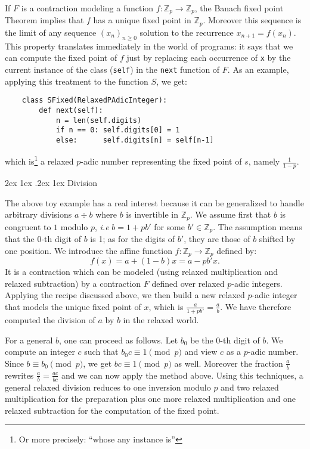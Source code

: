 \documentclass[11pt]{article}
\makeatletter
\numberwithin{equation}{section}
\numberwithin{figure}{section}
\renewcommand\paragraph{\@startsection{paragraph}{4}{\z@}%
                                    {2ex \@plus1ex \@minus.2ex}%
                                    {1ex}%
                                    {\normalfont\normalsize\bfseries}}
\renewcommand{\geq}{\geqslant}
\theoremstyle{definition}
\newcommand{\Z}{\mathbb Z}
\newcommand{\Zp}{\Z_p}
\newcommand{\ttx}{\texttt{\rm x}\xspace}
\makeatother
\begin{document}
If $F$ is a contraction modeling a function $f : \Zp \to \Zp$, the 
Banach fixed point Theorem implies that $f$ has a unique fixed point in 
$\Zp$. Moreover this sequence is the limit of any sequence 
$(x_n)_{n\geq0}$ solution to the recurrence $x_{n+1} = f(x_n)$. This 
property translates immediately in the world of programs: it says that 
we can compute the fixed point of $f$ just by replacing each occurrence 
of \ttx by the current instance of the class (\texttt{self}) in the 
\texttt{next} function of $F$. 
As an example, applying this treatment to the function $S$, we get:

\begin{lstlisting}
    class SFixed(RelaxedPAdicInteger):
        def next(self):
            n = len(self.digits)
            if n == 0: self.digits[0] = 1
            else:      self.digits[n] = self[n-1]
\end{lstlisting}

\noindent
which is\footnote{Or more precisely: ``whose any instance is''} a 
relaxed $p$-adic number representing the fixed point of $s$, namely
$\frac 1{1-p}$.

\paragraph{Division}

The above toy example has a real interest because it can be generalized 
to handle arbitrary divisions $a \div b$ where $b$ is invertible in $\Zp$.
We assume first that $b$ is congruent to $1$ modulo $p$, \emph{i.e} $b = 
1 + pb'$ for some $b' \in \Zp$. The assumption means that the $0$-th 
digit of $b$ is 1; as for the digits of $b'$, they are those of $b$ 
shifted by one position. We introduce the affine function $f : \Zp \to 
\Zp$ defined by:
$$f(x) = a + (1-b) x = a - p b' x.$$
It is a contraction which can be modeled (using relaxed multiplication 
and relaxed subtraction) by a contraction $F$ defined over relaxed
$p$-adic integers. Applying the recipe discussed above, we then build
a new relaxed $p$-adic integer that models the unique fixed point of
$x$, which is $\frac a {1+pb'} = \frac a b$. We have therefore computed
the division of $a$ by $b$ in the relaxed world.

For a general $b$, one can proceed as follows. Let $b_0$ be the $0$-th 
digit of $b$. We compute an integer $c$ such that $b_0 c \equiv 1 \pmod 
p$ and view $c$ as a $p$-adic number. Since $b \equiv b_0 \pmod p$, we 
get $bc \equiv 1 \pmod p$ as well. Moreover the fraction $\frac a b$ 
rewrites $\frac a b = \frac{ac}{bc}$ and we can now apply the method 
above. Using this techniques, a general relaxed division reduces to one
inversion modulo $p$ and two relaxed multiplication for the preparation 
plus one more relaxed multiplication and one relaxed subtraction for 
the computation of the fixed point.
\end{document}
